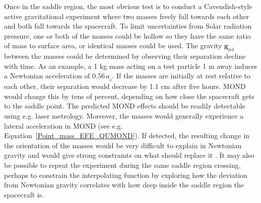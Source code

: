 \documentclass[fleqn,usenatbib,useAMS,onecolumn]{mnras} %
\begin{document}
Once in the saddle region, the most obvious test is to conduct a Cavendish-style active gravitational experiment where two masses freely fall towards each other and both fall towards the spacecraft. To limit uncertainties from Solar radiation pressure, one or both of the masses could be hollow so they have the same ratio of mass to surface area, or identical masses could be used. The gravity $\bm{g}_\text{rel}$ between the masses could be determined by observing their separation decline with time. As an example, a 1 kg mass acting on a test particle 1 m away induces a Newtonian acceleration of $0.56 \, a_{_0}$. If the masses are initially at rest relative to each other, their separation would decrease by 1.1 cm after five hours. MOND would change this by tens of percent, depending on how close the spacecraft gets to the saddle point. The predicted MOND effects should be readily detectable using e.g. laser metrology. Moreover, the masses would generally experience a lateral acceleration in MOND (see e.g. Equation~\ref{Point_mass_EFE_QUMOND}). If detected, the resulting change in the orientation of the masses would be very difficult to explain in Newtonian gravity and would give strong constraints on what should replace it \citep{Banik_2018_EFE}. It may also be possible to repeat the experiment during the same saddle region crossing, perhaps to constrain the interpolating function by exploring how the deviation from Newtonian gravity correlates with how deep inside the saddle region the spacecraft is.
\end{document}
